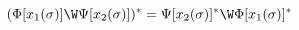 \begin{equation}\label{eq400:ps}
(\Phi[x_{1}(\sigma)]\W\Psi[x_{2}(\sigma)])^{*}=\Psi[x_{2}(\sigma)]^{*}\W\Phi[x_{1}(\sigma)]^{*}
\end{equation}

